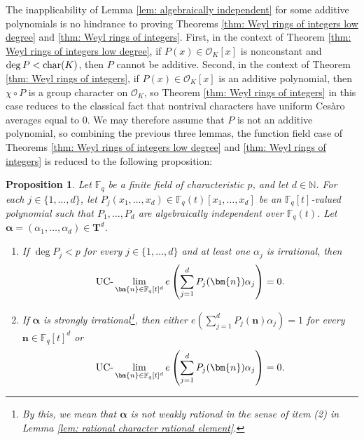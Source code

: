 \documentclass{amsart}
\newtheorem{proposition}[theorem]{Proposition}
\theoremstyle{definition}
\numberwithin{equation}{section}
\newcommand{\N}{\mathbb{N}}
\newcommand{\F}{\mathbb{F}}
\newcommand{\mO}{\mathcal{O}}
\newcommand{\UClim}{\textup{UC-}\lim}
\renewcommand{\char}{\textup{char}}
\begin{document}
The inapplicability of Lemma \ref{lem: algebraically independent} for some additive polynomials is no hindrance to proving Theorems \ref{thm: Weyl rings of integers low degree} and \ref{thm: Weyl rings of integers}.
First, in the context of Theorem \ref{thm: Weyl rings of integers low degree}, if $P(x) \in \mO_K[x]$ is nonconstant and $\deg{P} < \char(K)$, then $P$ cannot be additive.
Second, in the context of Theorem \ref{thm: Weyl rings of integers}, if $P(x) \in \mO_K[x]$ is an additive polynomial, then $\chi \circ P$ is a group character on $\mO_K$, so Theorem \ref{thm: Weyl rings of integers} in this case reduces to the classical fact that nontrival characters have uniform Ces\`{a}ro averages equal to 0.
We may therefore assume that $P$ is not an additive polynomial, so combining the previous three lemmas, the function field case of Theorems \ref{thm: Weyl rings of integers low degree} and \ref{thm: Weyl rings of integers} is reduced to the following proposition:

\begin{proposition} \label{prop: equidistribution theorems, exponential sum form}
    Let $\F_q$ be a finite field of characteristic $p$, and let $d \in \N$.
    For each $j \in \{1, \dots, d\}$, let $P_j(x_1, \dots, x_d) \in \F_q(t)[x_1, \dots, x_d]$ be an $\F_q[t]$-valued polynomial such that $P_1, \dots, P_d$ are algebraically independent over $\F_q(t)$.
    Let $\bm{\alpha} = (\alpha_1, \ldots, \alpha_d) \in \mathbf{T}^d$.
    \begin{enumerate}[(1)]
        \item If $\deg{P_j} < p$ for every $j \in \{1, \ldots, d\}$ and at least one $\alpha_j$ is irrational, then
        \begin{equation*}
            \UClim_{\bm{n} \in \F_q[t]^d} e \left( \sum_{j=1}^d P_j(\bm{n}) \alpha_j \right) = 0.
        \end{equation*}
        \item If $\bm{\alpha}$ is strongly irrational\footnote{By this, we mean that $\bm{\alpha}$ is not weakly rational in the sense of item (2) in Lemma \ref{lem: rational character rational element}.}, then either $e \left( \sum_{j=1}^d P_j(\bm{n})\alpha_j \right) = 1$ for every $\bm{n} \in \F_q[t]^d$ or
    \begin{equation*}
        \UClim_{\bm{n} \in \F_q[t]^d} e \left( \sum_{j=1}^d P_j(\bm{n}) \alpha_j \right) = 0.
    \end{equation*}
    \end{enumerate}
\end{proposition}
\end{document}
